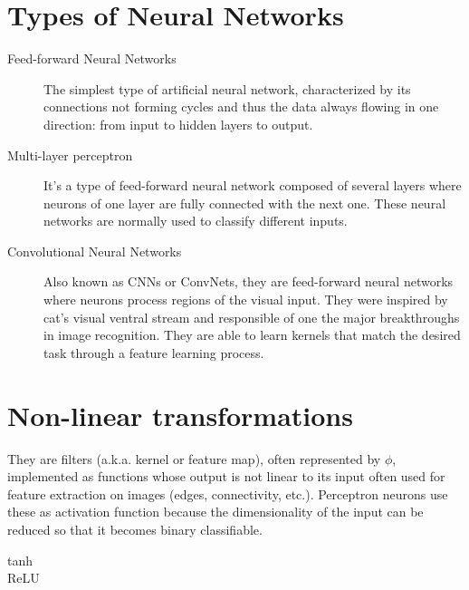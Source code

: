 
\section{Types of Neural Networks}
\label{sec:Types of Neural Networks}

\begin{description}
  \item[Feed-forward Neural Networks]
  The simplest type of artificial neural network, characterized by its connections not forming cycles and thus the data always flowing in one direction: from input to hidden layers to output.

  \item[Multi-layer perceptron]
  It's a type of feed-forward neural network composed of several layers where neurons of one layer are fully connected with the next one. These neural networks are normally used to classify different inputs.

  \item[Convolutional Neural Networks] Also known as CNNs or ConvNets, they are feed-forward neural networks where neurons process regions of the visual input. They were inspired by cat's visual ventral stream  and responsible of one the major breakthroughs in image recognition. They are able to learn kernels that match the desired task through a feature learning process.
\end{description}



\section{Non-linear transformations}
\label{sec:Non-linear transformations}

They are filters (a.k.a. kernel or feature map), often represented by $\phi$, implemented as functions whose output is not linear to its input often used for feature extraction on images (edges, connectivity, etc.). Perceptron neurons use these as activation function because the dimensionality of the input can be reduced so that it becomes binary classifiable.

\begin{description}
  \item[tanh]
  \item[ReLU]
\end{description}
